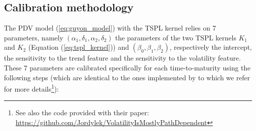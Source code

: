 \subsection{Calibration methodology} \label{sec:calib_meth}
The PDV model (\ref{eq:guyon_model}) with the TSPL kernel relies on 7 parameters, namely $(\alpha_1,\delta_1,\alpha_2,\delta_2)$ the parameters of the two TSPL kernels $K_1$ and $K_2$ (Equation (\ref{eq:tspl_kernel})) and $(\beta_0,\beta_1,\beta_2)$, respectively the intercept, the sensitivity to the trend feature and the sensitivity to the volatility feature. These 7 parameters are calibrated specifically for each time-to-maturity using the following steps (which are identical to the ones implemented by \cite{guyon2022volatility} to which we refer for more details\footnote{See also the code provided with their paper: \url{https://github.com/Jordylek/VolatilityIsMostlyPathDependent}}):
